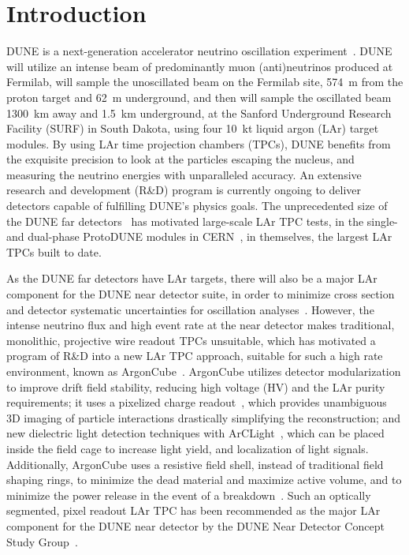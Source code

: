 \section{Introduction}
\label{sec:introduction}

DUNE is a next-generation accelerator neutrino oscillation experiment~\cite{DUNE, DUNE2}. DUNE will utilize an intense beam of predominantly muon (anti)neutrinos produced at Fermilab, will sample the unoscillated beam on the Fermilab site, \SI{574}{\metre} from the proton target and \SI{62}{\metre} underground, and then will sample the oscillated beam \SI{1300}{\kilo\metre} away and \SI{1.5}{\kilo\metre} underground, at the Sanford Underground Research Facility (SURF) in South Dakota, using four \SI{10}{\kilo\tonne} liquid argon (LAr) target modules. By using LAr time projection chambers (TPCs), DUNE benefits from the exquisite precision to look at the particles escaping the nucleus, and measuring the neutrino energies with unparalleled accuracy. An extensive research and development (R\&D) program is currently ongoing to deliver detectors capable of fulfilling DUNE's physics goals. The unprecedented size of the DUNE far detectors~\cite{DUNE_IDR_v1, DUNE_IDR_v2, DUNE_IDR_v3} has motivated large-scale LAr TPC tests, in the single- and dual-phase ProtoDUNE modules in CERN~\cite{Abi:2017aow, Agostino:2014qoa}, in themselves, the largest LAr TPCs built to date.

As the DUNE far detectors have LAr targets, there will also be a major LAr component for the DUNE near detector suite, in order to minimize cross section and detector systematic uncertainties for oscillation analyses~\cite{DUNE, DUNE2}. However, the intense neutrino flux and high event rate at the near detector makes traditional, monolithic, projective wire readout TPCs unsuitable, which has motivated a program of R\&D into a new LAr TPC approach, suitable for such a high rate environment, known as ArgonCube~\cite{argoncube_loi}. ArgonCube utilizes detector modularization to improve drift field stability, reducing high voltage (HV) and the LAr purity requirements; it uses a pixelized charge readout~\cite{pixels, larpix}, which provides unambiguous 3D imaging of particle interactions drastically simplifying the reconstruction; and new dielectric light detection techniques with ArCLight~\cite{arclight}, which can be placed inside the field cage to increase light yield, and localization of light signals. Additionally, ArgonCube uses a resistive field shell, instead of traditional field shaping rings, to minimize the dead material and maximize active volume, and to minimize the power release in the event of a breakdown~\cite{argoncube_fd}. Such an optically segmented, pixel readout LAr TPC has been recommended as the major LAr component for the DUNE near detector by the DUNE Near Detector Concept Study Group~\cite{dune_ndcsg}.

